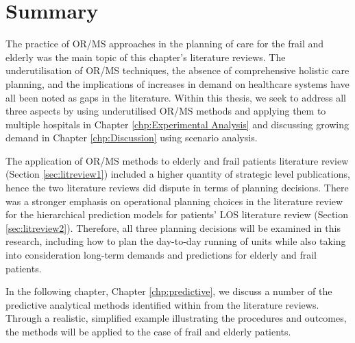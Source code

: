 \documentclass[../thesis.tex]{subfiles}
\begin{document}
\section{Summary}\label{sec:litreviewsum}
The practice of OR/MS approaches in the planning of care for the frail and elderly was the main topic of this chapter's literature reviews. The underutilisation of OR/MS techniques, the absence of comprehensive holistic care planning, and the implications of increases in demand on healthcare systems have all been noted as gaps in the literature. Within this thesis, we seek to address all three aspects by using underutilised OR/MS methods and applying them to multiple hospitals in Chapter \ref{chp:Experimental Analysis} and discussing growing demand in Chapter \ref{chp:Discussion} using scenario analysis.

The application of OR/MS methods to elderly and frail patients literature review (Section \ref{sec:litreview1}) included a higher quantity of strategic level publications, hence the two literature reviews did dispute in terms of planning decisions. There was a stronger emphasis on operational planning choices in the literature review for  the hierarchical prediction models for patients' LOS literature review (Section \ref{sec:litreview2}). Therefore, all three planning decisions will be examined in this research, including how to plan the day-to-day running of units while also taking into consideration long-term demands and predictions for elderly and frail patients.

In the following chapter, Chapter \ref{chp:predictive}, we discuss a number of the predictive analytical methods identified within from the literature reviews. Through a realistic, simplified example illustrating the procedures and outcomes, the methods will be applied to the case of frail and elderly patients. 
\end{document}
